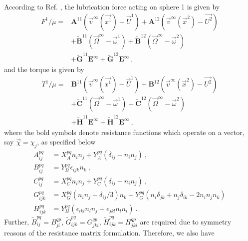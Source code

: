 \documentclass[reprint, amsmath,amssymb,aps,pre,onecolumn,notitlepage%
]{revtex4-1}
\begin{document}
According to Ref. \cite{KK1991}, the lubrication force acting on sphere 1 is given by
\begin{equation}
	\begin{split}
		F^1/\mu=& \bm{A}^{11}(\vec{v}^\infty(\vec{x^1})-\vec{U}^1)+\bm{A}^{12}(\vec{v}^\infty(\vec{x}^2)-\vec{U^2})\\
		&+ \widetilde{\bm{B}}^{11}(\vec{\Omega}^\infty-\vec{\omega}^1)+\widetilde{\bm{B}}^{12}(\vec{\Omega}^\infty-\vec{\omega}^2)\\
		&+ \widetilde{\bm{G}}^{11}\bm{E}^\infty + \widetilde{\bm{G}}^{12}\bm{E}^\infty \ ,
	\end{split}
	\label{eq:force1}
\end{equation}
and the torque is given by
\begin{equation}
	\begin{split}
		T^1/\mu=& \bm{B}^{11}(\vec{v}^\infty(\vec{x^1})-\vec{U}^1)+\bm{B}^{12}(\vec{v}^\infty(\vec{x}^2)-\vec{U^2})\\
		&+ \widetilde{\bm{C}}^{11}(\vec{\Omega}^\infty-\vec{\omega}^1)+\widetilde{\bm{C}}^{12}(\vec{\Omega}^\infty-\vec{\omega}^2)\\
		&+ \widetilde{\bm{H}}^{11}\bm{E}^\infty + \widetilde{\bm{H}}^{12}\bm{E}^\infty \ ,
	\end{split}
	\label{eq:torque1}
\end{equation}
where the bold symbols denote resistance functions which operate on a vector, say $\vec{\chi}=\chi_j$, as specified below
\begin{equation}
	\begin{split}
		A^{pq}_{ij}&=X_A^{pq}n_in_j+Y_A^{pq}(\delta_{ij}-n_in_j)\ ,\\
		B^{pq}_{ij}&=Y_B^{pq}\epsilon_{ijk}n_k\ ,\\
		C^{pq}_{ij}&=X_C^{pq}n_in_j+Y_C^{pq}(\delta_{ij}-n_in_j)\ ,\\
		G^{pq}_{ijk}&=X_G^{pq}(n_in_j-\delta_{ij}/3)n_k+Y_G^{pq}(n_i\delta_{jk}+n_j\delta_{ik}-2n_in_jn_k)\\
		H^{pq}_{ijk}&=Y_H^{pq}(\epsilon_{ikl} n_l n_j+\epsilon_{jkl} n_l n_i)\ .
	\end{split}
	\label{eq:x_terms}
\end{equation}
Further, $\widetilde{B}^{pq}_{ij}=B^{qp}_{ji}$, $\widetilde{G}^{pq}_{ijk}=G^{qp}_{jki}$, $\widetilde{H}^{pq}_{ijk}=H^{qp}_{jki}$ are required due to symmetry reasons of the resistance matrix formulation. Therefore, we also have
\end{document}
